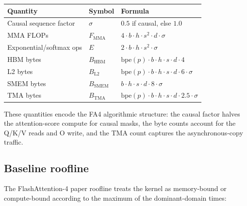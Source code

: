 \documentclass[
  11pt,
]{article}
\newcounter{none} %
\begin{document}
{\def\LTcaptype{none} %
\begin{longtable}[]{@{}
  >{\raggedright\arraybackslash}p{}
  >{\raggedright\arraybackslash}p{}
  >{\raggedright\arraybackslash}p{}@{}}
\toprule\noalign{}
\begin{minipage}[b]{\linewidth}\raggedright
Quantity
\end{minipage} & \begin{minipage}[b]{\linewidth}\raggedright
Symbol
\end{minipage} & \begin{minipage}[b]{\linewidth}\raggedright
Formula
\end{minipage} \\
\midrule\noalign{}
\endhead
\bottomrule\noalign{}
\endlastfoot
Causal sequence factor & \(\sigma\) & \(0.5\) if causal, else \(1.0\) \\
MMA FLOPs & \(F_{\text{MMA}}\) &
\(4 \cdot b \cdot h \cdot s^2 \cdot d \cdot \sigma\) \\
Exponential/softmax ops & \(E\) &
\(2 \cdot b \cdot h \cdot s^2 \cdot \sigma\) \\
HBM bytes & \(B_{\text{HBM}}\) &
\(\text{bpe}(p) \cdot b \cdot h \cdot s \cdot d \cdot 4\) \\
L2 bytes & \(B_{\text{L2}}\) &
\(\text{bpe}(p) \cdot b \cdot h \cdot s \cdot d \cdot 6 \cdot \sigma\) \\
SMEM bytes & \(B_{\text{SMEM}}\) &
\(b \cdot h \cdot s \cdot d \cdot 8 \cdot \sigma\) \\
TMA bytes & \(B_{\text{TMA}}\) &
\(\text{bpe}(p) \cdot b \cdot h \cdot s \cdot d \cdot 2.5 \cdot \sigma\) \\
\end{longtable}
}

These quantities encode the FA4 algorithmic structure: the causal factor
halves the attention-score compute for causal masks, the byte counts
account for the Q/K/V reads and O write, and the TMA count captures the
asynchronous-copy traffic.

\subsection{Baseline roofline}\label{baseline-roofline}

The FlashAttention-4 paper roofline treats the kernel as memory-bound or
compute-bound according to the maximum of the dominant-domain times:
\end{document}
